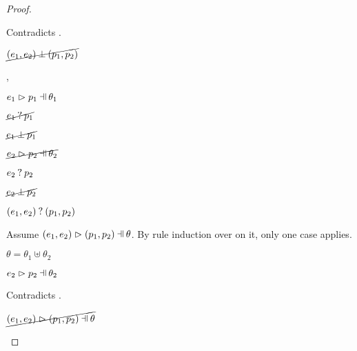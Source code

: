 \begin{proof}
\begin{byCases}
\begin{byCases}
\begin{byCases}
\begin{byCases}
                Contradicts .
            \end{byCases}
            \begin{pfsteps*}
            \item $\cancel{(e_1 , e_2) \mathbin{\bot} (p_1 , p_2)}$ 
            \end{pfsteps*}
        \item[\hpatmatch{e_1}{p_1}{\theta_1},\hmaymatch{e_2}{p_2}]
            \begin{pfsteps*}
            \item $\hpatmatch{e_1}{p_1}{\theta_1}$  
            \item $\cancel{e_1 \mathbin{?} p_1}$  
            \item $\cancel{e_1 \mathbin{\bot} p_1}$  
            \item $\cancel{\hpatmatch{e_2}{p_2}{\theta_2}}$  
            \item $e_2 \mathbin{?} p_2$  
            \item $\cancel{e_2 \mathbin{\bot} p_2}$  
            \item $(e_1 , e_2) \mathbin{?} (p_1 , p_2)$ 
            \end{pfsteps*}
            Assume $\hpatmatch{\hpair{e_1}{e_2}}{\hpair{p_1}{p_2}}{\theta}$. By rule induction over  on it, only one case applies.
            \begin{byCases}
            \item[\text{(\ref{rule:MPair})}]
                \begin{pfsteps*}
                \item $\theta=\theta_1\uplus\theta_2$
                \item $\hpatmatch{e_2}{p_2}{\theta_2}$ 
                \end{pfsteps*}
                Contradicts .
            \end{byCases}
            \begin{pfsteps*}
            \item $\cancel{\hpatmatch{\hpair{e_1}{e_2}}{\hpair{p_1}{p_2}}{\theta}}$ 

\end{pfsteps*}
\end{byCases}
\end{byCases}
\end{byCases}
\end{proof}
